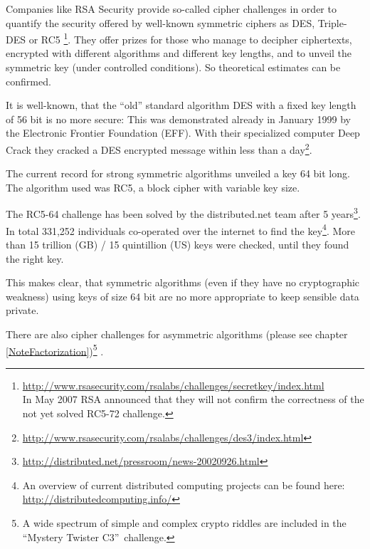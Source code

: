 Companies like RSA Security provide so-called cipher challenges in order
to quantify the security offered by well-known symmetric ciphers as DES,
Triple-DES or RC5%
%
\footnote{%
 \url{http://www.rsasecurity.com/rsalabs/challenges/secretkey/index.html}\\
 In May 2007 RSA announced that they will not confirm the correctness of
 the not yet solved RC5-72 challenge.}.
They offer prizes for those who manage to decipher ciphertexts, encrypted with different algorithms and different key lengths, and to unveil the symmetric key (under controlled conditions). So theoretical estimates can be confirmed.

It is well-known, that the ``old'' standard algorithm DES with a fixed key length
of 56 bit is no more secure: This was demonstrated already in January 1999 by the
Electronic Frontier Foundation (EFF). With their specialized computer Deep Crack
they cracked a DES encrypted message within less than a day\footnote{%
 \url{http://www.rsasecurity.com/rsalabs/challenges/des3/index.html}
}.

The current record for strong symmetric algorithms unveiled a key 64 bit long.
The algorithm used was RC5, a block cipher with variable key size. 

The RC5-64 challenge has been solved by the distributed.net team after 5
years\footnote{%
 \url{http://distributed.net/pressroom/news-20020926.html}
}.
In total 331,252 individuals co-operated over the internet to find the key\footnote{%
An overview of current distributed computing projects can be found here:\\
\url{http://distributedcomputing.info/}
}.
More than 15 trillion (GB) / 15 quintillion (US)  keys were checked, until they
found the right key.

This makes clear, that symmetric algorithms (even if they have no
cryptographic weakness) using keys of size 64 bit are no more appropriate
to keep sensible data private.

There are also cipher challenges for asymmetric algorithms (please
see chapter \ref{NoteFactorization})\footnote{%
  A wide spectrum of simple and complex crypto riddles are included
  in the ``Mystery Twister C3''~challenge.
  }
.



